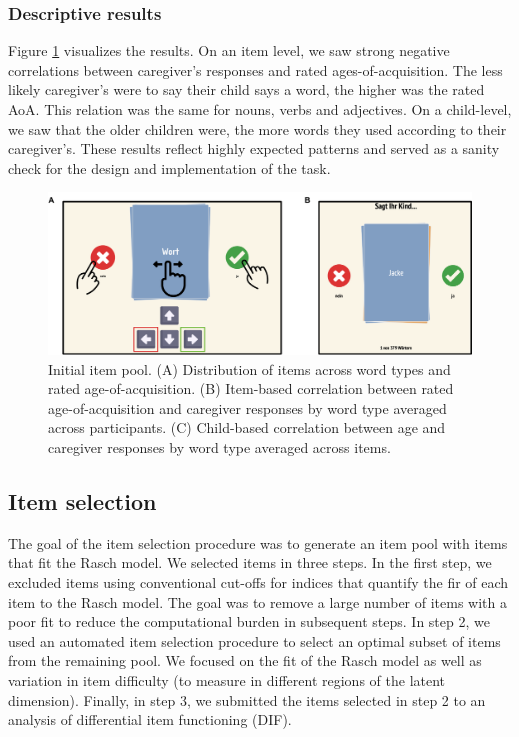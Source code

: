 \documentclass[
  man,floatsintext]{apa6}
\begin{document}
\hypertarget{descriptive-results}{%
\subsubsection{Descriptive results}\label{descriptive-results}}

Figure \ref{fig:fig2} visualizes the results. On an item level, we saw strong negative correlations between caregiver's responses and rated ages-of-acquisition. The less likely caregiver's were to say their child says a word, the higher was the rated AoA. This relation was the same for nouns, verbs and adjectives. On a child-level, we saw that the older children were, the more words they used according to their caregiver's. These results reflect highly expected patterns and served as a sanity check for the design and implementation of the task.



\begin{figure}

{\centering \includegraphics[width=1\linewidth]{../graphs/fig2} 

}

\caption{Initial item pool. (A) Distribution of items across word types and rated age-of-acquisition. (B) Item-based correlation between rated age-of-acquisition and caregiver responses by word type averaged across participants. (C) Child-based correlation between age and caregiver responses by word type averaged across items.}\label{fig:fig2}
\end{figure}

\hypertarget{item-selection}{%
\subsection{Item selection}\label{item-selection}}

The goal of the item selection procedure was to generate an item pool with items that fit the Rasch model. We selected items in three steps. In the first step, we excluded items using conventional cut-offs for indices that quantify the fir of each item to the Rasch model. The goal was to remove a large number of items with a poor fit to reduce the computational burden in subsequent steps. In step 2, we used an automated item selection procedure to select an optimal subset of items from the remaining pool. We focused on the fit of the Rasch model as well as variation in item difficulty (to measure in different regions of the latent dimension). Finally, in step 3, we submitted the items selected in step 2 to an analysis of differential item functioning (DIF).
\end{document}
